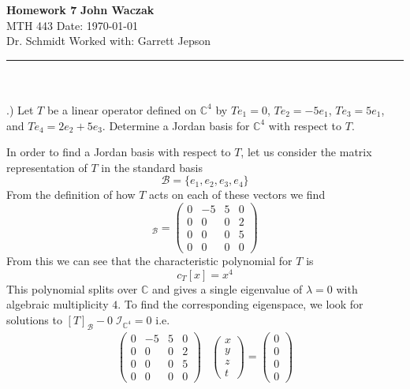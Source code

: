 \documentclass[a4paper, 11pt]{article}
\newcommand{\C}{\mathbb{C}}
\newenvironment{solution}{%
	\begin{list}{}{%
			\setlength{\topsep}{0pt}%
			\setlength{\leftmargin}{1.5cm}%
			\setlength{\rightmargin}{1.5cm}%
			\setlength{\listparindent}{\parindent}%
			\setlength{\itemindent}{\parindent}%
			\setlength{\parsep}{\parskip}%
		}%
		\item[]}{\end{list}}
\begin{document}
\noindent
\large\textbf{Homework 7} \hfill \textbf{John Waczak} \\
\normalsize MTH 443 \hfill  Date: \today \\
Dr. Schmidt \hfill Worked with: Garrett Jepson 
\par\noindent\rule{\textwidth}{0.4pt} \\\\

.) Let $T$ be a linear operator defined on $\C^4$ by $Te_1 =0$, $Te_2=-5e_1$, $Te_3=5e_1$, and $Te_4 = 2e_2 + 5e_3$. Determine a Jordan basis for $\C^4$ with respect to $T$. \\

\begin{solution}
  \noindent In order to find a Jordan basis with respect to $T$, let us consider the matrix representation of $T$ in the standard basis
  \begin{equation*}
    \mathcal{B} = \{e_1, e_2, e_3, e_4\}
  \end{equation*}
  From the definition of how $T$ acts on each of these vectors we find
  \begin{equation*}
    [T]_\mathcal{B} = \begin{pmatrix}
      0 & -5 & 5 & 0 \\
      0 & 0 & 0 & 2 \\
      0 & 0 & 0 & 5 \\
      0 & 0 & 0 & 0 \end{pmatrix}
  \end{equation*}
  From this we can see that the characteristic polynomial for $T$ is
  \begin{equation*}
    c_T[x] = x^4
  \end{equation*}
  This polynomial splits over $\C$ and gives a single eigenvalue of $\lambda = 0$ with algebraic multiplicity $4$. To find the corresponding eigenspace, we look for solutions to $[T]_\mathcal{B}-0\;\mathcal{I}_{\C^4}=0$ i.e.
  \begin{align*}
    \begin{pmatrix}
      0 & -5 & 5 & 0 \\
      0 & 0 & 0 & 2 \\
      0 & 0 & 0 & 5 \\
      0 & 0 & 0 & 0 \end{pmatrix}&\begin{pmatrix} x \\ y \\ z \\ t \end{pmatrix} = \begin{pmatrix} 0 \\ 0 \\ 0 \\ 0 \end{pmatrix} \\

\end{align*}
\end{solution}
\end{document}
